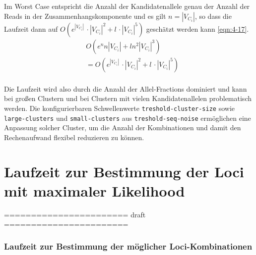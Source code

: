 Im Worst Case entspricht die Anzahl der Kandidatenallele genau der Anzahl der Reads in der Zusammenhangskomponente und es gilt $ n = |V_{C_{i}}| $, so dass die Laufzeit dann auf $  O( e^{|V_{C_{i}}|} \, \cdotp  |V_{C_{i}}|^2 + l \, \cdotp |V_{C_{i}}|^5) $ geschätzt werden kann \eqref{eqn:4-17}.
\begin{equation} \label{eqn:4-17}
\tag{4-17}
\begin{aligned}
&\ {} O( e^n n |V_{C_{i}}| + l n^2 |V_{C_{i}}|^3) \\
&\ {} = O( e^{|V_{C_{i}}|} \, \cdotp  |V_{C_{i}}|^2 + l \, \cdotp |V_{C_{i}}|^5)\\
\end{aligned}
\end{equation}

Die Laufzeit wird also durch die Anzahl der Allel-Fractions dominiert und kann bei großen Clustern und bei Clustern mit vielen Kandidatenallelen problematisch werden. Die konfigurierbaren Schwellenwerte \lstinline|treshold-cluster-size| sowie \lstinline|large-clusters| und \lstinline|small-clusters| aus \lstinline|treshold-seq-noise| ermöglichen eine Anpassung solcher Cluster, um die Anzahl der Kombinationen und damit den Rechenaufwand flexibel reduzieren zu können.


\section[Laufzeit der Loci-Zuordnung]{Laufzeit zur Bestimmung der Loci mit maximaler Likelihood}

======================= draft =======================\\

\subsubsection{Laufzeit zur Bestimmung der möglicher Loci-Kombinationen}

